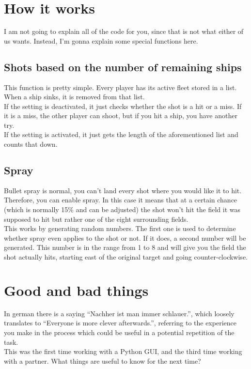 \documentclass[12pt]{scrartcl}
\begin{document}
	\clearpage


	\section{How it works}\label{sec:how_it_works}
	I am not going to explain all of the code for you, since that is not what either of us wants. Instead, I'm gonna explain some special functions here.

	\subsection{Shots based on the number of remaining ships}
	This function is pretty simple. Every player has its active fleet stored in a list. When a ship sinks, it is removed from that list. \\
	If the setting is deactivated, it just checks whether the shot is a hit or a miss. If it is a miss, the other player can shoot, but if you hit a ship, you have another try.\\
	If the setting is activated, it just gets the length of the aforementioned list and counts that down.

	\subsection{Spray}
	Bullet spray is normal, you can't land every shot where you would like it to hit. Therefore, you can enable spray. In this case it means that at a certain chance (which is normally 15\% and can be adjusted) the shot won't hit the field it was supposed to hit but rather one of the eight surrounding fields. \\
	This works by generating random numbers. The first one is used to determine whether spray even applies to the shot or not. If it does, a second number will be generated. This number is in the range from 1 to 8 and will give you the field the shot actually hits, starting east of the original target and going counter-clockwise.


	\clearpage


	\section{Good and bad things}\label{sec:good_and_bad_things}
	In german there is a saying \enquote{Nachher ist man immer schlauer.}, which loosely translates to \enquote{Everyone is more clever afterwards.}, referring to the experience you make in the process which could be useful in a potential repetition of the task.\\
	This was the first time working with a Python GUI, and the third time working with a partner. What things are useful to know for the next time? \\
\end{document}
